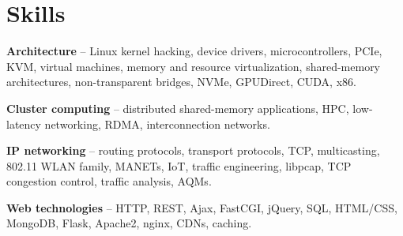 
\section{Skills}
\begin{small}
	\parbox[t][][t]{\linewidth}{
		\textbf{Architecture} -- Linux kernel hacking, device drivers,
		microcontrollers,
		PCIe, KVM, virtual machines, memory and resource virtualization,
		shared-memory architectures, non-transparent bridges, 
		NVMe, GPUDirect, CUDA, x86.
		\smallbreak
	}
	\parbox[t][][t]{\linewidth}{
		\textbf{Cluster computing} -- distributed shared-memory applications, HPC, low-latency
		networking, RDMA, interconnection networks.
		\smallbreak
	}
	\parbox[t][][t]{\linewidth}{
		\textbf{IP networking} -- routing protocols, transport protocols, TCP,
		multicasting, 802.11 WLAN family, MANETs, IoT,  
		traffic engineering, libpcap, TCP congestion control, traffic
		analysis, AQMs. 
		\smallbreak
	}
	\parbox[t][][t]{\linewidth}{
		\textbf{Web technologies} -- HTTP, REST, Ajax, FastCGI, jQuery, 
		SQL, HTML/CSS, MongoDB, Flask, Apache2, nginx, CDNs, caching.
		\smallbreak
	}
\end{small}
